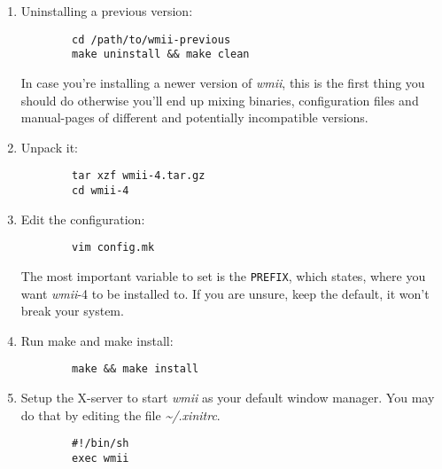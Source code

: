 \documentclass[12pt,a4paper]{article} %
\newcommand{\wmii}{\emph{wmii}}
\begin{document}
    \begin{enumerate}
      
    \item Uninstalling a previous version:
      \begin{verbatim}
        cd /path/to/wmii-previous
        make uninstall && make clean 
      \end{verbatim}

      In case you're installing a newer version of \wmii, this is the
      first thing you should do otherwise you'll end up mixing
      binaries, configuration files and manual-pages of different and
      potentially incompatible versions.

    \item Unpack it:
      \begin{verbatim}
        tar xzf wmii-4.tar.gz
        cd wmii-4
      \end{verbatim}
      
    \item Edit the configuration:
      \begin{verbatim}
        vim config.mk
      \end{verbatim}
      
      The most important variable to set is the \verb+PREFIX+, which
      states, where you want \wmii-4 to be installed to. If you are unsure, keep the
      default, it won't break your system.
      
    \item Run make and make install:
      \begin{verbatim}
        make && make install
      \end{verbatim}
      
    \item Setup the X-server to start \wmii{} as your default window
      manager. You may do that by editing the file \emph{\~{}/.xinitrc}.

      \begin{verbatim}
        #!/bin/sh
        exec wmii
      \end{verbatim}


    \end{enumerate}
    
\end{document}
